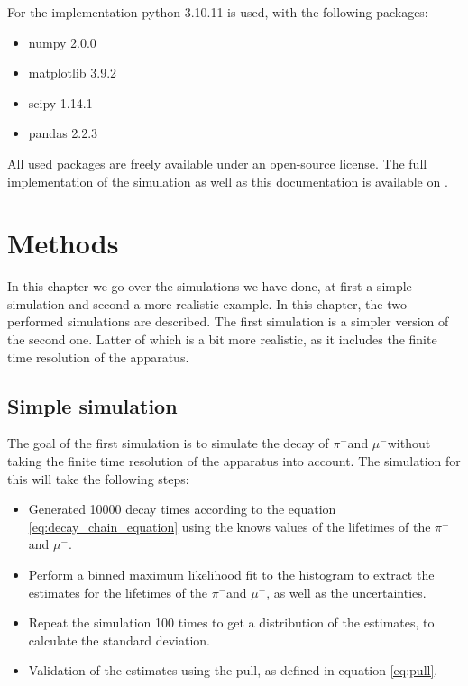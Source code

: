 \documentclass[11pt, a4paper, oneside]{book}
\newcommand{\pion}{$\pi^{-}$}
\newcommand{\muon}{$\mu^{-}$}
\begin{document}
For the implementation python 3.10.11 is used, with the following packages:
\begin{itemize}
    \item numpy 2.0.0
    \item matplotlib 3.9.2
    \item scipy 1.14.1
    \item pandas 2.2.3
\end{itemize}
All used packages are freely available under an open-source license. 
The full implementation of the simulation as well as this documentation is available on \cite{GitHub}.


\FloatBarrier
\chapter{Methods}

In this chapter we go over the simulations we have done, at first a simple simulation and second a more realistic example.
In this chapter, the two performed simulations are described. The first simulation is a simpler version of the second one. Latter of which is a bit more realistic, as it includes the finite time resolution of the apparatus. 

\section{Simple simulation}
The goal of the first simulation is to simulate the decay of \pion and \muon without taking the finite time resolution of the apparatus into account. The simulation for this will take the following steps:
\begin{itemize}
    \item Generated \num{10000} decay times according to the equation \ref{eq:decay_chain_equation} using the knows values of the lifetimes of the \pion and \muon.
    \item Perform a binned maximum likelihood fit to the histogram to extract the estimates for the lifetimes of the \pion and \muon, as well as the uncertainties.
    \item Repeat the simulation \num{100} times to get a distribution of the estimates, to calculate the standard deviation.
    \item Validation of the estimates using the pull, as defined in equation \ref{eq:pull}.
\end{itemize}
\end{document}
